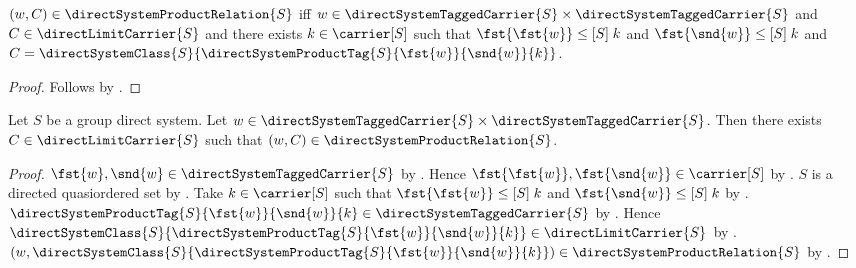 \begin{proposition}\label{direct_system_product_relation_iff}
    $(w,C)\in\directSystemProductRelation{S}$ iff
        $w\in\directSystemTaggedCarrier{S}\times
            \directSystemTaggedCarrier{S}$ and
        $C\in\directLimitCarrier{S}$ and
        there exists $k\in\carrier[S]$ such that
            $\fst{\fst{w}}\mathrel{\leq[S]}k$ and
            $\fst{\snd{w}}\mathrel{\leq[S]}k$ and
            $C=\directSystemClass{S}
                {\directSystemProductTag{S}{\fst{w}}{\snd{w}}{k}}$.
\end{proposition}
\begin{proof}
    Follows by
        .
\end{proof}

\begin{lemma}\label{direct_system_product_relation_total}
    Let $S$ be a group direct system.
    Let $w\in\directSystemTaggedCarrier{S}\times
        \directSystemTaggedCarrier{S}$.
    Then there exists $C\in\directLimitCarrier{S}$ such that
        $(w,C)\in\directSystemProductRelation{S}$.
\end{lemma}
\begin{proof}
    $\fst{w},\snd{w}\in\directSystemTaggedCarrier{S}$ by
        .
    Hence $\fst{\fst{w}},\fst{\snd{w}}\in\carrier[S]$ by
        .
    $S$ is a directed quasiordered set by
        .
    Take $k\in\carrier[S]$ such that
        $\fst{\fst{w}}\mathrel{\leq[S]}k$ and
        $\fst{\snd{w}}\mathrel{\leq[S]}k$ by
        .
    $\directSystemProductTag{S}{\fst{w}}{\snd{w}}{k}\in
        \directSystemTaggedCarrier{S}$ by
        .
    Hence $\directSystemClass{S}
        {\directSystemProductTag{S}{\fst{w}}{\snd{w}}{k}}\in
        \directLimitCarrier{S}$ by
        .
    $(w,\directSystemClass{S}
        {\directSystemProductTag{S}{\fst{w}}{\snd{w}}{k}})
        \in\directSystemProductRelation{S}$ by
        .
\end{proof}

